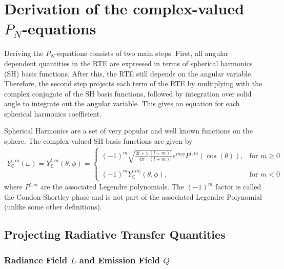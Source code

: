 \documentclass{egpubl}
\newcommand{\SHBC}{Y_{\mathbb{C}}} %
\begin{document}
\setcounter{tocdepth}{2}
\tableofcontents
{}


\section{Derivation of the complex-valued $P_N$-equations}

Deriving the $P_N$-equations consists of two main steps. First, all angular dependent quantities in the RTE are expressed in terms of spherical harmonics (SH) basis functions. After this, the RTE still depends on the angular variable. Therefore, the second step projects each term of the RTE by multiplying with the complex conjugate of the SH basis functions, followed by integration over solid angle to integrate out the angular variable. This gives an equation for each spherical harmonics coefficient.

Spherical Harmonics are a set of very popular and well known functions on the sphere. The complex-valued SH basis functions are given by
\begin{align}
\SHBC^{l,m}(\omega) = \SHBC^{l,m}(\theta, \phi)=
\begin{cases}
(-1)^m\sqrt{\frac{2l+1}{4\pi}\frac{(l-m)!}{(l+m)!}}e^{im\phi}P^{l,m}\left(\operatorname{cos}\left(\theta\right)\right), & \text{for $m\ge0$}\\
\left(-1\right)^m\overline{\SHBC^{l\left|m\right|}}(\theta, \phi), & \text{for $m<0$}
\end{cases}
\end{align}
where $P^{l,m}$ are the associated Legendre polynomials. The $\left(-1\right)^m$ factor is called the Condon-Shortley phase and is not part of the associated Legendre Polynomial (unlike some other definitions).

\subsection{Projecting Radiative Transfer Quantities}

\subsubsection{Radiance Field $L$ and Emission Field $Q$}
\label{sec:complex_proj_L}
\end{document}
